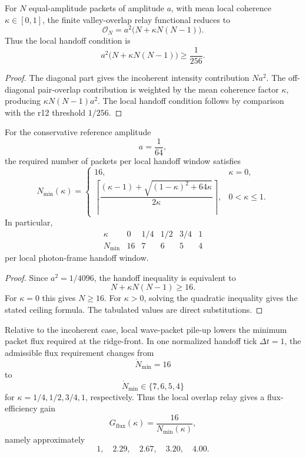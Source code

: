 \begin{lemma}
\label{lem:v470-r13-equal-amplitude-overlap-flux-law}
For \(N\) equal-amplitude packets of amplitude \(a\), with mean local coherence
\(\kappa\in[0,1]\), the finite valley-overlap relay functional reduces to
\[
\mathcal O_N
=
 a^2\bigl(N+\kappa N(N-1)\bigr).
\]
Thus the local handoff condition is
\[
 a^2\bigl(N+\kappa N(N-1)\bigr)
 \geq \frac{1}{256}.
\]
\end{lemma}

\begin{proof}
The diagonal part gives the incoherent intensity contribution
\(Na^2\).  The off-diagonal pair-overlap contribution is weighted by the mean
coherence factor \(\kappa\), producing \(\kappa N(N-1)a^2\).  The local handoff
condition follows by comparison with the r12 threshold \(1/256\).
\end{proof}

\begin{proposition}
\label{prop:v470-r13-minimum-packet-flux-calculation}
For the conservative reference amplitude
\[
a=\frac{1}{64},
\]
the required number of packets per local handoff window satisfies
\[
N_{\min}(\kappa)
=
\begin{cases}
16, & \kappa=0,\\[3pt]
\left\lceil
\dfrac{(\kappa-1)+\sqrt{(1-\kappa)^2+64\kappa}}{2\kappa}
\right\rceil,&0<\kappa\leq1.
\end{cases}
\]
In particular,
\[
\begin{array}{c|ccccc}
\kappa & 0 & 1/4 & 1/2 & 3/4 & 1\\
\hline
N_{\min} & 16 & 7 & 6 & 5 & 4
\end{array}
\]
per local photon-frame handoff window.
\end{proposition}

\begin{proof}
Since \(a^2=1/4096\), the handoff inequality is equivalent to
\[
N+\kappa N(N-1)\geq16.
\]
For \(\kappa=0\) this gives \(N\geq16\).  For \(\kappa>0\), solving the
quadratic inequality gives the stated ceiling formula.  The tabulated values
are direct substitutions.
\end{proof}

\begin{corollary}
\label{cor:v470-r13-wavefront-flux-gain}
Relative to the incoherent case, local wave-packet pile-up lowers the minimum
packet flux required at the ridge-front.  In one normalized handoff tick
\(\Delta t=1\), the admissible flux requirement changes from
\[
\dot N_{\min}=16
\]
to
\[
\dot N_{\min}\in\{7,6,5,4\}
\]
for \(\kappa=1/4,1/2,3/4,1\), respectively.  Thus the local overlap relay gives
a flux-efficiency gain
\[
G_{\mathrm{flux}}(\kappa)=\frac{16}{N_{\min}(\kappa)},
\]
namely approximately
\[
1,
\quad
2.29,
\quad
2.67,
\quad
3.20,
\quad
4.00.
\]
\end{corollary}

